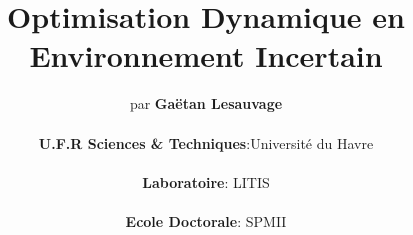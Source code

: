 \documentclass[12pt]{report}
\begin{document}
\author{par \textbf{Gaëtan Lesauvage}\\
\\\textbf{U.F.R Sciences \& Techniques}:Université du Havre\\
\\\textbf{Laboratoire}: LITIS\\
\\\textbf{Ecole Doctorale}: SPMII
}

\title{Optimisation Dynamique en Environnement Incertain}






\maketitle










%



\tableofcontents

\end{document}
